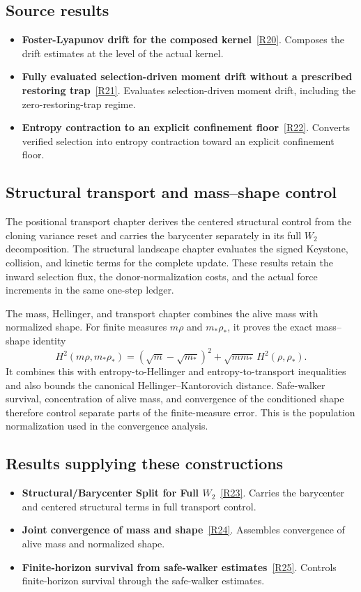 \documentclass[11pt,a4paper]{article}
\begin{document}
\subsection*{Source results}
\begin{itemize}
\item \textbf{Foster-Lyapunov drift for the composed kernel}~\hyperref[src:thm-foster-lyapunov-main]{[R20]}. Composes the drift estimates at the level of the actual kernel.
\item \textbf{Fully evaluated selection-driven moment drift without a prescribed restoring trap}~\hyperref[src:thm-slceg-full-moment]{[R21]}. Evaluates selection-driven moment drift, including the zero-restoring-trap regime.
\item \textbf{Entropy contraction to an explicit confinement floor}~\hyperref[src:thm-slce-entropy-floor]{[R22]}. Converts verified selection into entropy contraction toward an explicit confinement floor.
\end{itemize}
\subsection*{Structural transport and mass--shape control}
The positional transport chapter derives the centered structural control from the cloning variance reset and carries the barycenter separately in its full \(W_2\) decomposition. The structural landscape chapter evaluates the signed Keystone, collision, and kinetic terms for the complete update. These results retain the inward selection flux, the donor-normalization costs, and the actual force increments in the same one-step ledger.

The mass, Hellinger, and transport chapter combines the alive mass with normalized shape. For finite measures \(m\rho\) and \(m_*\rho_*\), it proves the exact mass--shape identity
\[
H^2(m\rho,m_*\rho_*)
=(\sqrt m-\sqrt{m_*})^2+\sqrt{mm_*}\,H^2(\rho,\rho_*).
\]
It combines this with entropy-to-Hellinger and entropy-to-transport inequalities and also bounds the canonical Hellinger--Kantorovich distance. Safe-walker survival, concentration of alive mass, and convergence of the conditioned shape therefore control separate parts of the finite-measure error. This is the population normalization used in the convergence analysis.
\subsection*{Results supplying these constructions}
\begin{itemize}
\item \textbf{Structural/Barycenter Split for Full \(W_2\)}~\hyperref[src:thm-full-w2-split]{[R23]}. Carries the barycenter and centered structural terms in full transport control.
\item \textbf{Joint convergence of mass and shape}~\hyperref[src:thm-hk-convergence-main-assembly]{[R24]}. Assembles convergence of alive mass and normalized shape.
\item \textbf{Finite-horizon survival from safe-walker estimates}~\hyperref[src:thm-exponential-survival]{[R25]}. Controls finite-horizon survival through the safe-walker estimates.
\end{itemize}
\end{document}
